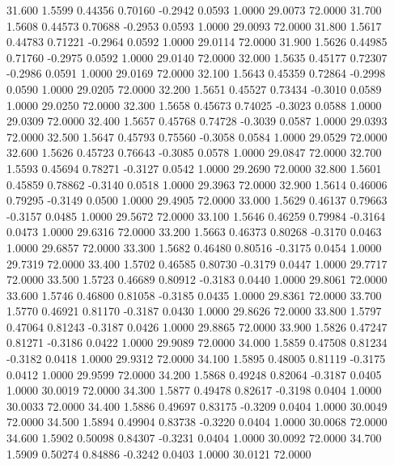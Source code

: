   31.600   1.5599   0.44356   0.70160  -0.2942   0.0593   1.0000  29.0073  72.0000
  31.700   1.5608   0.44573   0.70688  -0.2953   0.0593   1.0000  29.0093  72.0000
  31.800   1.5617   0.44783   0.71221  -0.2964   0.0592   1.0000  29.0114  72.0000
  31.900   1.5626   0.44985   0.71760  -0.2975   0.0592   1.0000  29.0140  72.0000
  32.000   1.5635   0.45177   0.72307  -0.2986   0.0591   1.0000  29.0169  72.0000
  32.100   1.5643   0.45359   0.72864  -0.2998   0.0590   1.0000  29.0205  72.0000
  32.200   1.5651   0.45527   0.73434  -0.3010   0.0589   1.0000  29.0250  72.0000
  32.300   1.5658   0.45673   0.74025  -0.3023   0.0588   1.0000  29.0309  72.0000
  32.400   1.5657   0.45768   0.74728  -0.3039   0.0587   1.0000  29.0393  72.0000
  32.500   1.5647   0.45793   0.75560  -0.3058   0.0584   1.0000  29.0529  72.0000
  32.600   1.5626   0.45723   0.76643  -0.3085   0.0578   1.0000  29.0847  72.0000
  32.700   1.5593   0.45694   0.78271  -0.3127   0.0542   1.0000  29.2690  72.0000
  32.800   1.5601   0.45859   0.78862  -0.3140   0.0518   1.0000  29.3963  72.0000
  32.900   1.5614   0.46006   0.79295  -0.3149   0.0500   1.0000  29.4905  72.0000
  33.000   1.5629   0.46137   0.79663  -0.3157   0.0485   1.0000  29.5672  72.0000
  33.100   1.5646   0.46259   0.79984  -0.3164   0.0473   1.0000  29.6316  72.0000
  33.200   1.5663   0.46373   0.80268  -0.3170   0.0463   1.0000  29.6857  72.0000
  33.300   1.5682   0.46480   0.80516  -0.3175   0.0454   1.0000  29.7319  72.0000
  33.400   1.5702   0.46585   0.80730  -0.3179   0.0447   1.0000  29.7717  72.0000
  33.500   1.5723   0.46689   0.80912  -0.3183   0.0440   1.0000  29.8061  72.0000
  33.600   1.5746   0.46800   0.81058  -0.3185   0.0435   1.0000  29.8361  72.0000
  33.700   1.5770   0.46921   0.81170  -0.3187   0.0430   1.0000  29.8626  72.0000
  33.800   1.5797   0.47064   0.81243  -0.3187   0.0426   1.0000  29.8865  72.0000
  33.900   1.5826   0.47247   0.81271  -0.3186   0.0422   1.0000  29.9089  72.0000
  34.000   1.5859   0.47508   0.81234  -0.3182   0.0418   1.0000  29.9312  72.0000
  34.100   1.5895   0.48005   0.81119  -0.3175   0.0412   1.0000  29.9599  72.0000
  34.200   1.5868   0.49248   0.82064  -0.3187   0.0405   1.0000  30.0019  72.0000
  34.300   1.5877   0.49478   0.82617  -0.3198   0.0404   1.0000  30.0033  72.0000
  34.400   1.5886   0.49697   0.83175  -0.3209   0.0404   1.0000  30.0049  72.0000
  34.500   1.5894   0.49904   0.83738  -0.3220   0.0404   1.0000  30.0068  72.0000
  34.600   1.5902   0.50098   0.84307  -0.3231   0.0404   1.0000  30.0092  72.0000
  34.700   1.5909   0.50274   0.84886  -0.3242   0.0403   1.0000  30.0121  72.0000
